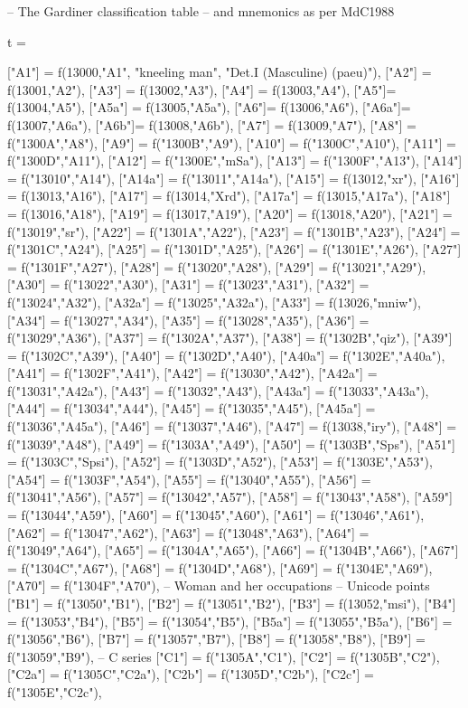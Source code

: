 \documentclass{article}
\begin{document}
\begin{luacode*}
-- The Gardiner classification table
-- and mnemonics as per MdC1988 

t ={
	["A1"]  = f(13000,"A1",
               "kneeling man",
               "Det.I (Masculine) (paeu)"),
   ["A2"] = f(13001,"A2"),
   ["A3"] = f(13002,"A3"),
	["A4"] = f(13003,"A4"),
   ["A5"]= f(13004,"A5"),  
	["A5a"] = f(13005,"A5a"),
	["A6"]= f(13006,"A6"),
	["A6a"]= f(13007,"A6a"),
	["A6b"]= f(13008,"A6b"),
   ["A7"] = f(13009,"A7"),
	["A8"] = f("1300A","A8"),
	["A9"] = f("1300B","A9"),
	["A10"] = f("1300C","A10"),
	["A11"] = f("1300D","A11"),
	["A12"] = f("1300E","mSa"),
	["A13"] = f("1300F","A13"),
	["A14"] = f("13010","A14"),
	["A14a"] = f("13011","A14a"),
  	["A15"] = f(13012,"xr"),
  	["A16"] = f(13013,"A16"),
  	["A17"] = f(13014,"Xrd"),
  	["A17a"] = f(13015,"A17a"),
  	["A18"] = f(13016,"A18"),
  	["A19"] = f(13017,"A19"),
  	["A20"] = f(13018,"A20"),
  	["A21"] = f("13019","sr"),
  	["A22"] = f("1301A","A22"),
  	["A23"] = f("1301B","A23"),
  	["A24"] = f("1301C","A24"),
  	["A25"] = f("1301D","A25"),
  	["A26"] = f("1301E","A26"),
  	["A27"] = f("1301F","A27"),
  	["A28"] = f("13020","A28"),
  	["A29"] = f("13021","A29"),
  	["A30"] = f("13022","A30"),
  	["A31"] = f("13023","A31"),
  	["A32"] = f("13024","A32"),
 	["A32a"] = f("13025","A32a"),
  	["A33"] = f(13026,"mniw"),
	["A34"] = f("13027","A34"),
	["A35"] = f("13028","A35"),
	["A36"] = f("13029","A36"),
	["A37"] = f("1302A","A37"),
	["A38"] = f("1302B","qiz"),
	["A39"] = f("1302C","A39"),
	["A40"] = f("1302D","A40"),
	["A40a"] = f("1302E","A40a"),
	["A41"] = f("1302F","A41"),
	["A42"] = f("13030","A42"),
	["A42a"] = f("13031","A42a"),
	["A43"] = f("13032","A43"),
	["A43a"] = f("13033","A43a"),
	["A44"] = f("13034","A44"),
	["A45"] = f("13035","A45"),
	["A45a"] = f("13036","A45a"),
	["A46"] = f("13037","A46"),
  	["A47"] = f(13038,"iry"),
	["A48"] = f("13039","A48"),
	["A49"] = f("1303A","A49"),
  	["A50"] = f("1303B","Sps"),
  	["A51"] = f("1303C","Spsi"),
	["A52"] = f("1303D","A52"),
	["A53"] = f("1303E","A53"),
	["A54"] = f("1303F","A54"),
	["A55"] = f("13040","A55"),
	["A56"] = f("13041","A56"),
	["A57"] = f("13042","A57"),
	["A58"] = f("13043","A58"),
	["A59"] = f("13044","A59"),
	["A60"] = f("13045","A60"),
	["A61"] = f("13046","A61"),
	["A62"] = f("13047","A62"),
	["A63"] = f("13048","A63"),
	["A64"] = f("13049","A64"),
	["A65"] = f("1304A","A65"),
	["A66"] = f("1304B","A66"),
	["A67"] = f("1304C","A67"),
	["A68"] = f("1304D","A68"),
	["A69"] = f("1304E","A69"),
	["A70"] = f("1304F","A70"),
-- Woman and her occupations
-- Unicode points 
	["B1"] = f("13050","B1"),
	["B2"] = f("13051","B2"),
	["B3"] = f(13052,"msi"),
	["B4"] = f("13053","B4"),
	["B5"] = f("13054","B5"),
	["B5a"] = f("13055","B5a"),
	["B6"] = f("13056","B6"),
	["B7"] = f("13057","B7"),
	["B8"] = f("13058","B8"),
	["B9"] = f("13059","B9"),
-- C series
	["C1"] = f("1305A","C1"),
	["C2"] = f("1305B","C2"),
	["C2a"] = f("1305C","C2a"),
	["C2b"] = f("1305D","C2b"),
	["C2c"] = f("1305E","C2c"),

}
\end{luacode*}
\end{document}
